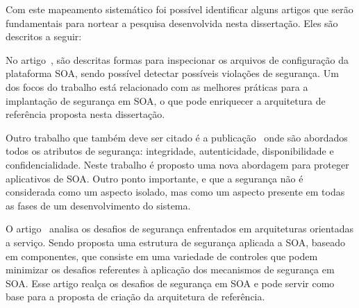 Com este mapeamento sistemático foi possível identificar alguns artigos que serão fundamentais para nortear a pesquisa desenvolvida nesta dissertação. Eles são descritos a seguir:

No artigo~\cite{WeberAM07}, são descritas formas para inspecionar os arquivos de configuração da plataforma SOA, sendo possível detectar possíveis violações de segurança. Um dos focos do trabalho está relacionado com as melhores práticas para a implantação de segurança em SOA, o que pode enriquecer a arquitetura de referência proposta nesta dissertação.

Outro trabalho que também deve ser citado é a publicação~\cite{pattern-driven2008} onde são abordados todos os atributos de segurança: integridade, autenticidade, disponibilidade e confidencialidade. Neste trabalho é proposto uma nova abordagem para proteger aplicativos de SOA. Outro ponto importante, e que a segurança não é considerada como um aspecto isolado, mas como um aspecto presente em todas as fases de um desenvolvimento do sistema.

O artigo~\cite{Coetzee2012} analisa os desafios de segurança enfrentados em arquiteturas orientadas a serviço. Sendo proposta uma estrutura de segurança aplicada a SOA, baseado em componentes, que consiste em uma variedade de controles que podem minimizar os desafios referentes à aplicação dos mecanismos de segurança em SOA. Esse artigo realça os desafios de segurança em SOA e pode servir como base para a proposta de criação da arquitetura de referência. 